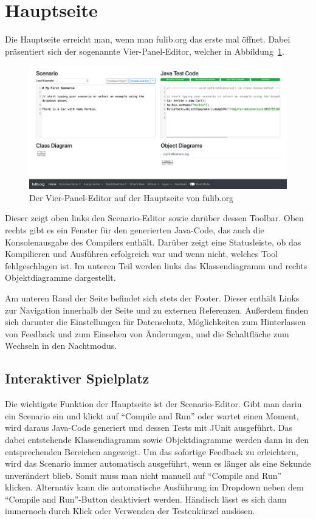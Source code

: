 \section{Hauptseite}\label{sec:main-page}

Die Hauptseite erreicht man, wenn man fulib.org das erste mal öffnet.
Dabei präsentiert sich der sogenannte Vier-Panel-Editor, welcher in Abbildung~\ref{fig:four-pane-editor}.

\begin{figure}
    \includegraphics[width=\textwidth]{chapter/fulib.org/img/four-pane-editor.png}
    \caption{Der Vier-Panel-Editor auf der Hauptseite von fulib.org}
    \label{fig:four-pane-editor}
\end{figure}

Dieser zeigt oben links den Scenario-Editor sowie darüber dessen Toolbar.
Oben rechts gibt es ein Fenster für den generierten Java-Code, das auch die Konsolenausgabe des Compilers enthält.
Darüber zeigt eine Statusleiste, ob das Kompilieren und Ausführen erfolgreich war und wenn nicht, welches Tool fehlgeschlagen ist.
Im unteren Teil werden links das Klassendiagramm und rechts Objektdiagramme dargestellt.

Am unteren Rand der Seite befindet sich stets der Footer.
Dieser enthält Links zur Navigation innerhalb der Seite und zu externen Referenzen.
Außerdem finden sich darunter die Einstellungen für Datenschutz,
Möglichkeiten zum Hinterlassen von Feedback und zum Einsehen von Änderungen,
und die Schaltfläche zum Wechseln in den Nachtmodus.

\subsection{Interaktiver Spielplatz}\label{subsec:interactive-playground}

Die wichtigste Funktion der Hauptseite ist der Scenario-Editor.
Gibt man darin ein Scenario ein und klickt auf ``Compile and Run'' oder wartet einen Moment,
wird daraus Java-Code generiert und dessen Tests mit JUnit ausgeführt.
Das dabei entstehende Klassendiagramm sowie Objektdiagramme werden dann in den entsprechenden Bereichen angezeigt.
Um das sofortige Feedback zu erleichtern, wird das Scenario immer automatisch ausgeführt, wenn es länger als eine Sekunde unverändert blieb.
Somit muss man nicht manuell auf ``Compile and Run'' klicken.
Alternativ kann die automatische Ausführung im Dropdown neben dem ``Compile and Run''-Button deaktiviert werden.
Händisch lässt es sich dann immernoch durch Klick oder Verwenden der Testenkürzel auslösen.

